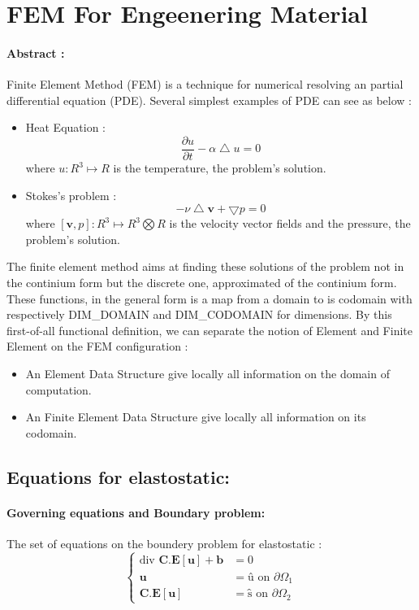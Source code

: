 \documentclass[a4paper,10pt]{article}
\begin{document}
\section{FEM For Engeenering Material}

\paragraph{Abstract : }
Finite Element Method (FEM) is a technique for numerical resolving an partial differential equation (PDE). Several simplest examples of PDE can see as below : 
\begin{itemize}
 \item Heat Equation : \[ \frac{\partial u}{\partial t} - \alpha \bigtriangleup u = 0 \]
where $u : R^{3} \mapsto R $ is the temperature, the problem's solution.
 \item Stokes's problem :   \[ - \nu \bigtriangleup \textbf{v} + \bigtriangledown p = 0 \]
where $[\textbf{v},p] : R^{3} \mapsto R^{3}\bigotimes R $ is the velocity vector fields and the pressure, the problem's solution.
\end{itemize}
The finite element method aims at finding these solutions of the problem not in the continium form but the discrete one, approximated of the continium form. These functions, in the general form is a map from a domain to is codomain with respectively DIM\_DOMAIN and DIM\_CODOMAIN for dimensions. By this first-of-all functional definition, we can separate the notion of Element and Finite Element on the FEM configuration :
\begin{itemize}
 \item An Element Data Structure give locally all information on the domain of computation.
 \item An Finite Element Data Structure  give locally all information on its codomain. 
\end{itemize}    
   

\subsection{Equations for elastostatic: } 

\paragraph{Governing equations and Boundary problem: }
The set of equations on the boundery problem for elastostatic :
\[
\left\{
\begin{array}{rl}
 \text{div }\textbf{C.E} \left[ \textbf{u} \right] + \textbf{b} & =0 \\
                                       \textbf{u} & = \textbf{\^{u}} \text{         on $\partial\Omega_1 $}\\
           \textbf{C.E} \left[ \textbf{u} \right] &= \textbf{\^{s}}  \text{         on $\partial\Omega_2 $}
\end{array}\right.
\]
\end{document}
